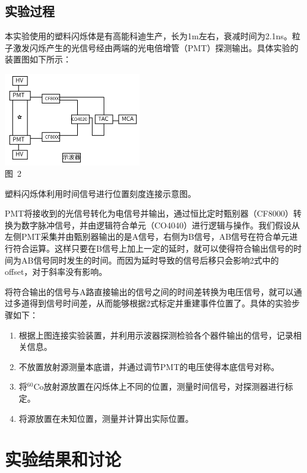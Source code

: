\documentclass[a4paper,10.0pt,twoside]{npr}
\begin{document}
\begin{multicols}{2}
\subsection{实验过程}

本实验使用的塑料闪烁体是有高能科迪生产，长为1m左右，衰减时间为2.1ns。粒子激发闪烁产生的光信号经由两端的光电倍增管（PMT）探测输出。具体实验的装置图如下所示：

\begin{center}
   \includegraphics[width=0.45\textwidth]{xianlu.png}
\\
\xiaowu\song 图~2\begin{minipage}[t]{75mm} \quad 塑料闪烁体利用时间信号进行位置刻度连接示意图。\\[-1mm]\wuhao
\end{minipage}
\end{center}

PMT将接收到的光信号转化为电信号并输出，通过恒比定时甄别器（CF8000）转换为数字脉冲信号，并由逻辑符合单元（CO4040）进行逻辑与操作。我们假设从左侧PMT采集并由甄别器输出的是A信号，右侧为B信号，AB信号在符合单元进行符合运算。这样只要在B信号上加上一定的延时，就可以使得符合输出信号的时间为AB信号同时发生的时间。而因为延时导致的信号后移只会影响2式中的offset，对于斜率没有影响。

将符合输出的信号与A路直接输出的信号之间的时间差转换为电压信号，就可以通过多道得到信号时间差，从而能够根据2式标定并重建事件位置了。具体的实验步骤如下：

\begin{enumerate}
\item 根据上图连接实验装置，并利用示波器探测检验各个器件输出的信号，记录相关信息。
\item 不放置放射源测量本底谱，并通过调节PMT的电压使得本底信号对称。
\item 将$^{60}$Co放射源放置在闪烁体上不同的位置，测量时间信号，对探测器进行标定。
\item 将源放置在未知位置，测量并计算出实际位置。
\end{enumerate}

\section{实验结果和讨论}


\end{multicols}
\end{document}

